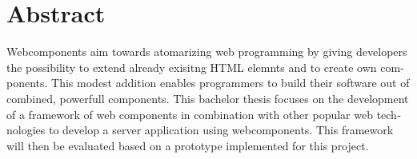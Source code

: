 \chapter{Abstract}

\begin{english}
	Webcomponents aim towards atomarizing web programming by giving developers the possibility to extend already exisitng HTML elemnts and to create own components. This modest addition enables programmers to build their software out of combined, powerfull components.
	This bachelor thesis focuses on the development of a framework of web components in combination with other popular web technologies to develop a server application using webcomponents. This framework will then be evaluated based on a prototype implemented for this project.
\end{english}
